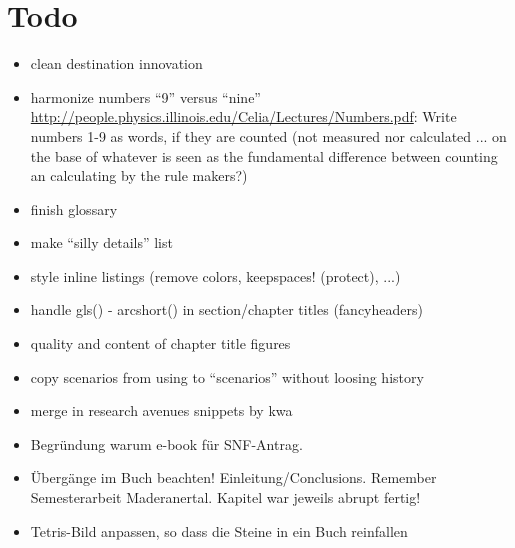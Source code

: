 \section*{Todo}

\begin{itemize}\styleItemize

\item clean destination innovation

\item harmonize numbers ``9'' versus ``nine'' \url{http://people.physics.illinois.edu/Celia/Lectures/Numbers.pdf}: Write numbers 1-9 as words, if they are counted (not measured nor calculated ... on the base of whatever is seen as the fundamental difference between counting an calculating by the rule makers?)

\item finish glossary

\item make ``silly details'' list

\item style inline listings (remove colors, keepspaces! (protect), ...)

\item handle gls() - arcshort() in section/chapter titles (fancyheaders)

\item quality and content of chapter title figures

\item copy scenarios from using to ``scenarios'' without loosing history

\item merge in research avenues snippets by kwa

\item Begründung warum e-book für SNF-Antrag.

\item Übergänge im Buch beachten! Einleitung/Conclusions. Remember Semesterarbeit Maderanertal. Kapitel war jeweils abrupt fertig!

\item Tetris-Bild anpassen, so dass die Steine in ein Buch reinfallen




\end{itemize}